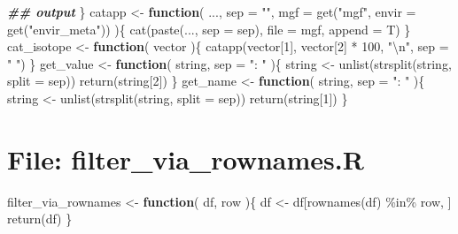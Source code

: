 \documentclass[
]{article}
\newenvironment{Shaded}{\begin{snugshade}}{\end{snugshade}}
\newcommand{\AttributeTok}[1]{\textcolor[rgb]{0.77,0.63,0.00}{#1}}
\newcommand{\ControlFlowTok}[1]{\textcolor[rgb]{0.13,0.29,0.53}{\textbf{#1}}}
\newcommand{\DecValTok}[1]{\textcolor[rgb]{0.00,0.00,0.81}{#1}}
\newcommand{\DocumentationTok}[1]{\textcolor[rgb]{0.56,0.35,0.01}{\textbf{\textit{#1}}}}
\newcommand{\FunctionTok}[1]{\textcolor[rgb]{0.00,0.00,0.00}{#1}}
\newcommand{\NormalTok}[1]{#1}
\newcommand{\OtherTok}[1]{\textcolor[rgb]{0.56,0.35,0.01}{#1}}
\newcommand{\SpecialCharTok}[1]{\textcolor[rgb]{0.00,0.00,0.00}{#1}}
\newcommand{\StringTok}[1]{\textcolor[rgb]{0.31,0.60,0.02}{#1}}
\begin{document}
\begin{Shaded}
\begin{Highlighting}[]
    \DocumentationTok{\#\# output}
\NormalTok{  \}}
\NormalTok{catapp }\OtherTok{\textless{}{-}}
  \ControlFlowTok{function}\NormalTok{(}
\NormalTok{    ...,}
    \AttributeTok{sep =} \StringTok{""}\NormalTok{,}
    \AttributeTok{mgf =} \FunctionTok{get}\NormalTok{(}\StringTok{"mgf"}\NormalTok{, }\AttributeTok{envir =} \FunctionTok{get}\NormalTok{(}\StringTok{"envir\_meta"}\NormalTok{))}
\NormalTok{    )\{}
    \FunctionTok{cat}\NormalTok{(}\FunctionTok{paste}\NormalTok{(..., }\AttributeTok{sep =}\NormalTok{ sep), }\AttributeTok{file =}\NormalTok{ mgf, }\AttributeTok{append =}\NormalTok{ T)}
\NormalTok{  \}}
\NormalTok{cat\_isotope }\OtherTok{\textless{}{-}} 
  \ControlFlowTok{function}\NormalTok{(}
\NormalTok{    vector}
\NormalTok{    )\{}
    \FunctionTok{catapp}\NormalTok{(vector[}\DecValTok{1}\NormalTok{], vector[}\DecValTok{2}\NormalTok{] }\SpecialCharTok{*} \DecValTok{100}\NormalTok{, }\StringTok{"}\SpecialCharTok{\textbackslash{}n}\StringTok{"}\NormalTok{, }\AttributeTok{sep =} \StringTok{" "}\NormalTok{)}
\NormalTok{  \}}
\NormalTok{get\_value }\OtherTok{\textless{}{-}}
  \ControlFlowTok{function}\NormalTok{(}
\NormalTok{    string,}
    \AttributeTok{sep =} \StringTok{": "}
\NormalTok{    )\{}
\NormalTok{    string }\OtherTok{\textless{}{-}} \FunctionTok{unlist}\NormalTok{(}\FunctionTok{strsplit}\NormalTok{(string, }\AttributeTok{split =}\NormalTok{ sep))}
    \FunctionTok{return}\NormalTok{(string[}\DecValTok{2}\NormalTok{])}
\NormalTok{  \}}
\NormalTok{get\_name }\OtherTok{\textless{}{-}}
  \ControlFlowTok{function}\NormalTok{(}
\NormalTok{    string,}
    \AttributeTok{sep =} \StringTok{": "}
\NormalTok{    )\{}
\NormalTok{    string }\OtherTok{\textless{}{-}} \FunctionTok{unlist}\NormalTok{(}\FunctionTok{strsplit}\NormalTok{(string, }\AttributeTok{split =}\NormalTok{ sep))}
    \FunctionTok{return}\NormalTok{(string[}\DecValTok{1}\NormalTok{])}
\NormalTok{  \}}
\end{Highlighting}
\end{Shaded}

\hypertarget{file-filter_via_rownames.r}{%
\section{File: filter\_via\_rownames.R}\label{file-filter_via_rownames.r}}

\begin{Shaded}
\begin{Highlighting}[]
\NormalTok{filter\_via\_rownames }\OtherTok{\textless{}{-}} 
  \ControlFlowTok{function}\NormalTok{(}
\NormalTok{           df,}
\NormalTok{           row}
\NormalTok{           )\{}
\NormalTok{    df }\OtherTok{\textless{}{-}}\NormalTok{ df[}\FunctionTok{rownames}\NormalTok{(df) }\SpecialCharTok{\%in\%}\NormalTok{ row, ]}
    \FunctionTok{return}\NormalTok{(df)}
\NormalTok{  \}}
\end{Highlighting}
\end{Shaded}
\end{document}
